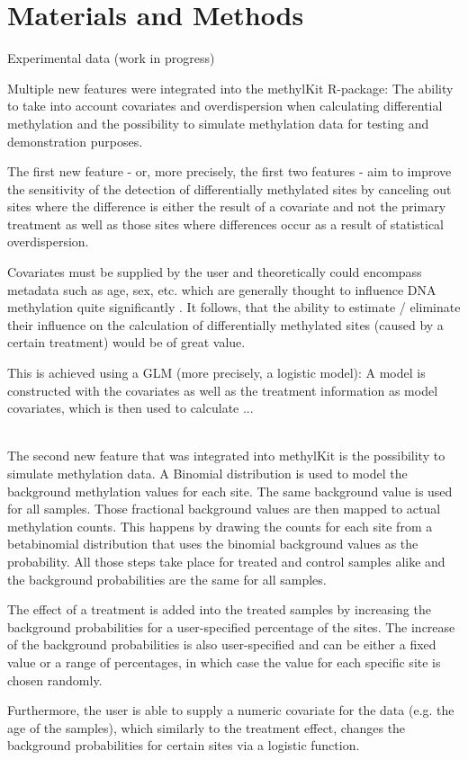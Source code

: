 \section{Materials and Methods}

Experimental data (work in progress)

Multiple new features were integrated into the methylKit R-package: The ability to take into account covariates and overdispersion when calculating differential methylation and the possibility to simulate methylation data for testing and demonstration purposes.

The first new feature - or, more precisely, the first two features - aim to  improve the sensitivity of the detection of differentially methylated sites by canceling out sites where the difference is either the result of a covariate and not the primary treatment as well as those sites where differences occur as a result of statistical overdispersion.

Covariates must be supplied by the user and theoretically could encompass metadata such as age, sex, etc. which are generally thought to influence DNA methylation quite significantly \cite{24561809}. It follows, that the ability to estimate / eliminate their influence on the calculation of differentially methylated sites (caused by a certain treatment) would be of great value.

This is achieved using a GLM (more precisely, a logistic model): A model is constructed with the covariates as well as the treatment information as model covariates, which is then used to calculate ...

\\
The second new feature that was integrated into methylKit is the possibility to simulate methylation data.
A Binomial distribution is used to model the background methylation values for each site. The same background value is used for all samples.
Those fractional background values are then mapped to actual methylation counts. This happens by drawing the counts for each site from a betabinomial distribution that uses the binomial background values as the probability.
All those steps take place for treated and control samples alike and the background probabilities are the same for all samples.

The effect of a treatment is added into the treated samples by increasing the background probabilities for a user-specified percentage of the sites. The increase of the background probabilities is also user-specified and can be either a fixed value or a range of percentages, in which case the value for each specific site is chosen randomly.

Furthermore, the user is able to supply a numeric covariate for the data (e.g. the age of the samples), which similarly to the treatment effect, changes the background probabilities for certain sites via a logistic function.